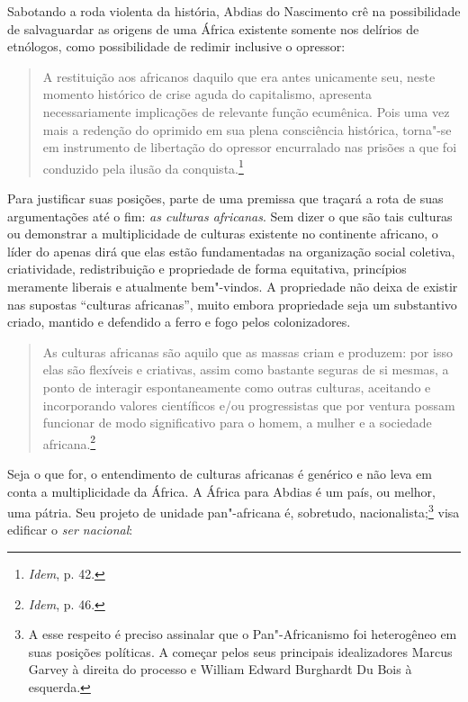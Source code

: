 Sabotando a roda violenta da história, Abdias do Nascimento crê na
possibilidade de salvaguardar as origens de uma África existente somente
nos delírios de etnólogos, como possibilidade de redimir inclusive o
opressor:

\begin{quote}
A restituição aos africanos daquilo que era antes unicamente seu, neste
momento histórico de crise aguda do capitalismo, apresenta
necessariamente implicações de relevante função ecumênica. Pois uma vez
mais a redenção do oprimido em sua plena consciência histórica, torna"-se
em instrumento de libertação do opressor encurralado nas prisões a que
foi conduzido pela ilusão da conquista.\footnote{\emph{Idem}, p. 42.}
\end{quote}

Para justificar suas posições,
parte de uma premissa que traçará a rota de suas argumentações até o
fim: \emph{as culturas africanas}. Sem dizer o que são tais culturas ou
demonstrar a multiplicidade de culturas existente no continente
africano, o líder do  apenas dirá que elas estão fundamentadas na
organização social coletiva, criatividade, redistribuição e propriedade
de forma equitativa, princípios meramente liberais e atualmente
bem"-vindos. A propriedade não
deixa de existir nas supostas ``culturas africanas'', muito embora
propriedade seja um substantivo criado, mantido e defendido a ferro e
fogo pelos colonizadores.

\begin{quote}
As culturas africanas são aquilo que as massas criam e produzem: por
isso elas são flexíveis e criativas, assim como bastante seguras de si
mesmas, a ponto de interagir espontaneamente como outras culturas,
aceitando e incorporando valores científicos e/ou progressistas que por
ventura possam funcionar de modo significativo para o homem, a mulher e
a sociedade africana.\footnote{\emph{Idem}, p. 46.}
\end{quote}

Seja o que for, o entendimento de culturas africanas é genérico e não
leva em conta a multiplicidade da África. A África para Abdias é um
país, ou melhor, uma pátria. Seu projeto de unidade pan"-africana é,
sobretudo, nacionalista;\footnote{A esse respeito é preciso assinalar que
  o Pan"-Africanismo foi heterogêneo em suas posições políticas. A
  começar pelos seus principais idealizadores Marcus Garvey à direita do
  processo e William Edward Burghardt Du Bois à esquerda.} visa
edificar o \emph{ser nacional}:

